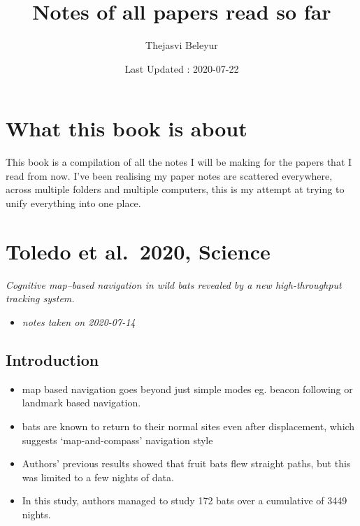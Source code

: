 \documentclass[
]{book}
\title{Notes of all papers read so far}
\author{Thejasvi Beleyur}
\date{Last Updated : 2020-07-22}
\providecommand{\tightlist}{%
  \setlength{\itemsep}{0pt}\setlength{\parskip}{0pt}}
\begin{document}
\maketitle

{
\setcounter{tocdepth}{1}
\tableofcontents
}
\hypertarget{what-this-book-is-about}{%
\chapter*{What this book is about}\label{what-this-book-is-about}}

This book is a compilation of all the notes I will be making for the papers that I read from now.
I've been realising my paper notes are scattered everywhere, across multiple folders and multiple computers,
this is my attempt at trying to unify everything into one place.

\hypertarget{toledo-et-al.-2020-science}{%
\chapter{Toledo et al.~2020, Science}\label{toledo-et-al.-2020-science}}


\emph{Cognitive map--based navigation in wild bats revealed by a new high-throughput tracking system.} \citep{toledo2020cognitive}

\begin{itemize}
\tightlist
\item
  \emph{notes taken on 2020-07-14}
\end{itemize}

\hypertarget{introduction}{%
\section{Introduction}\label{introduction}}

\begin{itemize}
\tightlist
\item
  map based navigation goes beyond just simple modes eg. beacon following or landmark based navigation.
\item
  bats are known to return to their normal sites even after displacement, which suggests `map-and-compass' navigation style
\item
  Authors' previous results showed that fruit bats flew straight paths, but this was limited to a few nights of data.
\item
  In this study, authors managed to study 172 bats over a cumulative of 3449 nights.
\end{itemize}
\end{document}
